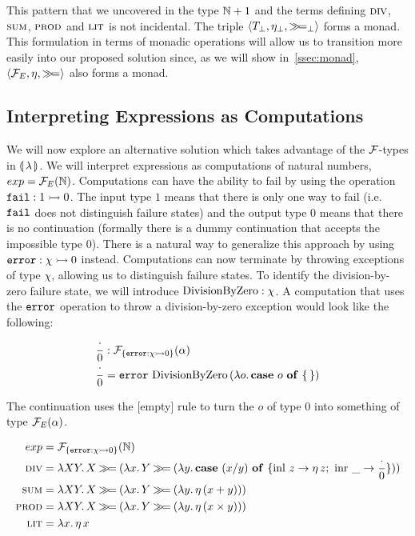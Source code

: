 This pattern that we uncovered in the type $\mathbb{N} + 1$ and the terms defining
$\textsc{div}$, $\textsc{sum}$, $\textsc{prod}$ and $\textsc{lit}$ is not incidental. The triple
$\left<T_\bot, \eta_\bot, \mathbin{\gg\!=}_\bot \right>$ forms a monad. This
formulation in terms of monadic operations will allow us to transition more
easily into our proposed solution since, as we will show
in~\ref{ssec:monad}, $\left< \mathcal{F}_E, \eta, \mathbin{\gg\!=} \right>$ also forms a
monad.


\subsection{Interpreting Expressions as Computations}
\label{ssec:expressions-as-computations}

We will now explore an alternative solution which takes advantage of the
$\mathcal{F}$-types in ${\llparenthesis \, \lambda \, \rrparenthesis}$. We will interpret expressions as computations of
natural numbers, $exp = \mathcal{F}_E(\mathbb{N})$. Computations can have the ability to
fail by using the operation $\mathtt{fail} : 1 \rightarrowtail 0$. The input type $1$
means that there is only one way to fail (i.e.\ $\mathtt{fail}$ does not
distinguish failure states) and the output type $0$ means that there is no
continuation (formally there is a dummy continuation that accepts the
impossible type $0$). There is a natural way to generalize this approach by
using $\mathtt{error} : \chi \rightarrowtail 0$ instead. Computations can now terminate by
throwing exceptions of type $\chi$, allowing us to distinguish failure
states. To identify the division-by-zero failure state, we will introduce
$\operatorname{DivisionByZero} : \chi$. A computation that uses the $\mathtt{error}$ operation to
throw a division-by-zero exception would look like the following:

\begin{align*}
  \frac{\cdot}{0} &: \mathcal{F}_{\{\mathtt{error} : \chi \rightarrowtail 0\}}(\alpha) \\
  \frac{\cdot}{0} &= \mathtt{error}\,\operatorname{DivisionByZero}\,(\lambda o.\, \text{\textbf{case} $o$ \textbf{of} \{\,\}})
\end{align*}

The continuation uses the [empty] rule to turn the $o$ of type $0$ into
something of type $\mathcal{F}_E(\alpha)$.

\begin{align*}
  exp &= \mathcal{F}_{\{\mathtt{error} : \chi \rightarrowtail 0\}}(\mathbb{N}) \\
  \textsc{div} &= \lambda X Y.\, X \mathbin{\gg\!=} (\lambda x.\, Y \mathbin{\gg\!=} (\lambda y.\, \text{\textbf{case} $(x / y)$ \textbf{of} $\{ \operatorname{inl}\,z \to \eta\,z;\ \operatorname{inr}\,\_ \to \frac{\cdot}{0} \}$})) \\
  \textsc{sum} &= \lambda X Y.\, X \mathbin{\gg\!=} (\lambda x.\, Y \mathbin{\gg\!=} (\lambda y.\, \eta\,(x + y))) \\
  \textsc{prod} &= \lambda X Y.\, X \mathbin{\gg\!=} (\lambda x.\, Y \mathbin{\gg\!=} (\lambda y.\, \eta\,(x \times y))) \\
  \textsc{lit} &= \lambda x.\, \eta\,x
\end{align*}

